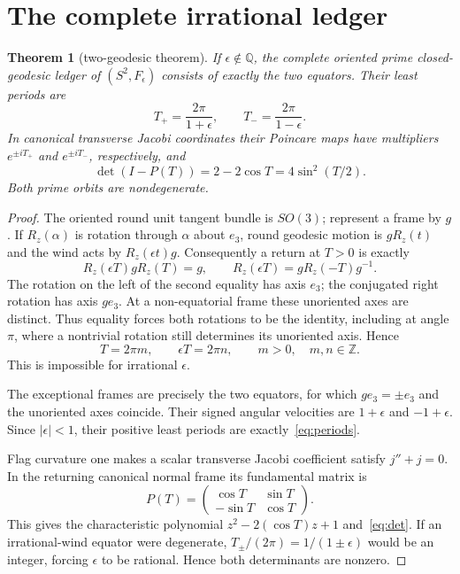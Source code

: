 \documentclass[10pt]{article}
\newtheorem{theorem}{Theorem}
\newcommand{\FF}{F_\epsilon}
\newcommand{\ZZ}{\mathbb Z}
\begin{document}
\section{The complete irrational ledger}

\begin{theorem}[two-geodesic theorem]\label{thm:main}
If $\epsilon\notin\mathbb Q$, the complete oriented prime closed-geodesic
ledger of $(S^2,\FF)$ consists of exactly the two equators.  Their least
periods are
\begin{equation}\label{eq:periods}
 T_+=\frac{2\pi}{1+\epsilon},\qquad
 T_-=\frac{2\pi}{1-\epsilon}.
\end{equation}
In canonical transverse Jacobi coordinates their Poincare maps have
multipliers $e^{\pm iT_+}$ and $e^{\pm iT_-}$, respectively, and
\begin{equation}\label{eq:det}
 \det(I-P(T))=2-2\cos T=4\sin^2(T/2).
\end{equation}
Both prime orbits are nondegenerate.
\end{theorem}

\begin{proof}
The oriented round unit tangent bundle is $SO(3)$; represent a frame by
$g$.  If $R_z(\alpha)$ is rotation through $\alpha$ about $e_3$, round
geodesic motion is $gR_z(t)$ and the wind acts by $R_z(\epsilon t)g$.
Consequently a return at $T>0$ is exactly
\begin{equation}\label{eq:return}
 R_z(\epsilon T)gR_z(T)=g,
 \qquad R_z(\epsilon T)=gR_z(-T)g^{-1}.
\end{equation}
The rotation on the left of the second equality has axis $e_3$; the
conjugated right rotation has axis $ge_3$.  At a non-equatorial frame these
unoriented axes are distinct.  Thus equality forces both rotations to be
the identity, including at angle $\pi$, where a nontrivial rotation still
determines its unoriented axis.  Hence
\begin{equation}\label{eq:closure}
 T=2\pi m,\qquad \epsilon T=2\pi n,\qquad m>0,\quad m,n\in\ZZ.
\end{equation}
This is impossible for irrational $\epsilon$.

The exceptional frames are precisely the two equators, for which
$ge_3=\pm e_3$ and the unoriented axes coincide.  Their signed angular
velocities are $1+\epsilon$ and
$-1+\epsilon$.  Since $|\epsilon|<1$, their positive least periods are
exactly~\eqref{eq:periods}.

Flag curvature one makes a scalar transverse Jacobi coefficient satisfy
$j''+j=0$.  In the returning canonical normal frame its fundamental matrix
is
\[
 P(T)=\begin{pmatrix}\cos T&\sin T\\-\sin T&\cos T\end{pmatrix}.
\]
This gives the characteristic polynomial
$z^2-2(\cos T)z+1$ and~\eqref{eq:det}.  If an irrational-wind equator were
degenerate, $T_\pm/(2\pi)=1/(1\pm\epsilon)$ would be an integer, forcing
$\epsilon$ to be rational.  Hence both determinants are nonzero.
\end{proof}
\end{document}

